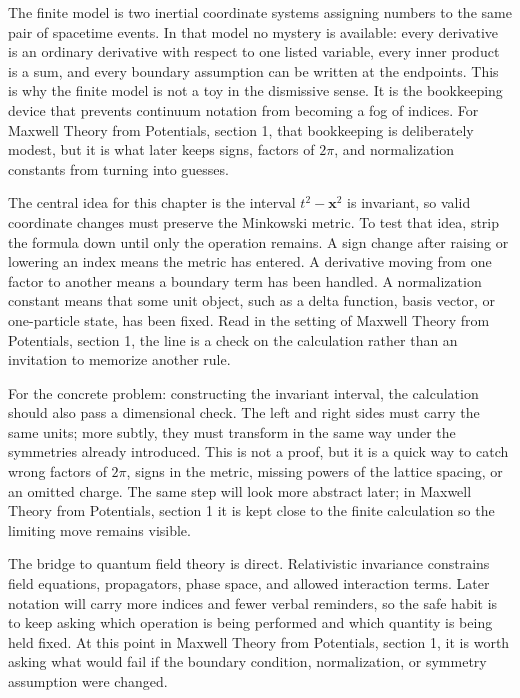 The finite model is two inertial coordinate systems assigning numbers to the same pair of spacetime events.  In that model no mystery is available: every derivative is an ordinary derivative with respect to one listed variable, every inner product is a sum, and every boundary assumption can be written at the endpoints.  This is why the finite model is not a toy in the dismissive sense.  It is the bookkeeping device that prevents continuum notation from becoming a fog of indices.  For Maxwell Theory from Potentials, section 1, that bookkeeping is deliberately modest, but it is what later keeps signs, factors of \(2\pi\), and normalization constants from turning into guesses.

The central idea for this chapter is the interval \(t^2-\bm x^2\) is invariant, so valid coordinate changes must preserve the Minkowski metric.  To test that idea, strip the formula down until only the operation remains.  A sign change after raising or lowering an index means the metric has entered.  A derivative moving from one factor to another means a boundary term has been handled.  A normalization constant means that some unit object, such as a delta function, basis vector, or one-particle state, has been fixed.  Read in the setting of Maxwell Theory from Potentials, section 1, the line is a check on the calculation rather than an invitation to memorize another rule.

For the concrete problem: constructing the invariant interval, the calculation should also pass a dimensional check.  The left and right sides must carry the same units; more subtly, they must transform in the same way under the symmetries already introduced.  This is not a proof, but it is a quick way to catch wrong factors of \(2\pi\), signs in the metric, missing powers of the lattice spacing, or an omitted charge.  The same step will look more abstract later; in Maxwell Theory from Potentials, section 1 it is kept close to the finite calculation so the limiting move remains visible.

The bridge to quantum field theory is direct.  Relativistic invariance constrains field equations, propagators, phase space, and allowed interaction terms.  Later notation will carry more indices and fewer verbal reminders, so the safe habit is to keep asking which operation is being performed and which quantity is being held fixed.  At this point in Maxwell Theory from Potentials, section 1, it is worth asking what would fail if the boundary condition, normalization, or symmetry assumption were changed.

